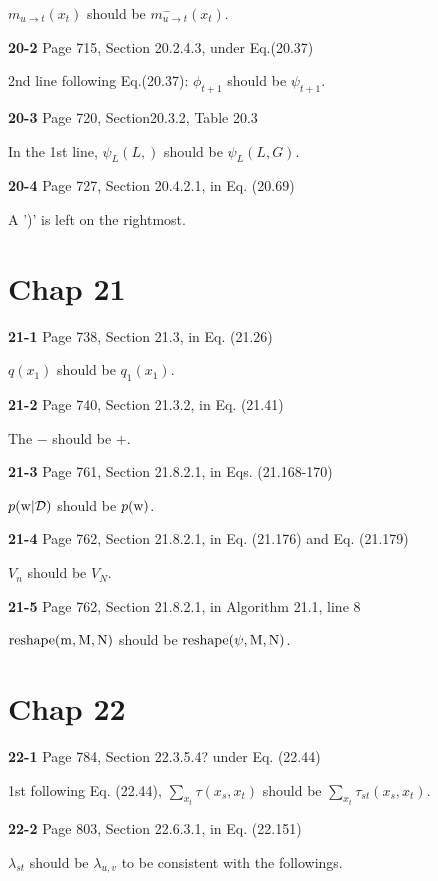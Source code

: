 \documentclass[aps,preprint,a4]{revtex4-1}
\begin{document}
$m_{u\rightarrow t}(x_{t})$ should be $m^{-}_{u\rightarrow t}(x_{t})$.

{\color{red}\textbf{20-2}} Page 715, Section 20.2.4.3, under Eq.(20.37)

2nd line following Eq.(20.37): $\phi_{t+1}$ should be $\psi_{t+1}$.

{\color{red}\textbf{20-3}} Page 720,  Section20.3.2, Table 20.3

In the 1st line, $\psi_{L}(L,)$ should be $\psi_{L}(L,G)$.

{\color{red}\textbf{20-4}} Page 727, Section 20.4.2.1, in Eq. (20.69)

A ')' is left on the rightmost.




\section{Chap 21}
{\color{red}\textbf{21-1}} Page 738, Section 21.3, in Eq. (21.26) 

$q(x_{1})$ should be $q_{1}(x_{1})$.

{\color{red}\textbf{21-2}} Page 740, Section 21.3.2, in Eq. (21.41)

The $-$ should be $+$.

{\color{red}\textbf{21-3}} Page 761, Section 21.8.2.1, in Eqs. (21.168-170)

$p(\rm w|\mathcal D)$ should be $p(\rm w)$.

{\color{red}\textbf{21-4}} Page 762, Section 21.8.2.1, in Eq. (21.176) and Eq. (21.179)

$V_{n}$ should be $V_{N}$.

{\color{red}\textbf{21-5}} Page 762, Section 21.8.2.1, in Algorithm 21.1, line 8

$\rm reshape(m,M,N)$ should be $\rm reshape(\psi,M,N)$.




\section{Chap 22}
{\color{red}\textbf{22-1}} Page 784, Section 22.3.5.4? under Eq. (22.44)

1st following Eq. (22.44), $\sum_{x_{t}}\tau(x_{s},x_{t})$ should be $\sum_{x_{t}}\tau_{st}(x_{s},x_{t})$.

{\color{red}\textbf{22-2}} Page 803, Section 22.6.3.1, in Eq. (22.151)

$\lambda_{st}$ should be $\lambda_{u,v}$ to be consistent with the followings.
\end{document}
